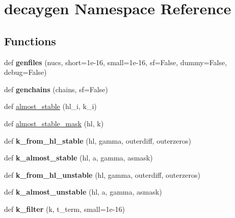 \hypertarget{namespacedecaygen}{}\section{decaygen Namespace Reference}
\label{namespacedecaygen}
\subsection*{Functions}
\begin{DoxyCompactItemize}
\item 
\mbox{\label{namespacedecaygen_adbcd52f4570e4712d8b5775dfab66488}} 
def {\bfseries genfiles} (nucs, short=1e-\/16, small=1e-\/16, sf=\+False, dummy=\+False, debug=\+False)
\item 
\mbox{\label{namespacedecaygen_add2576d70a319652092870680a494f61}} 
def {\bfseries genchains} (chains, sf=False)
\item 
def \hyperlink{namespacedecaygen_a8267524e00bea03ef7218742ef99b713}{almost\+\_\+stable} (hl\+\_\+i, k\+\_\+i)
\item 
def \hyperlink{namespacedecaygen_a03f99e352f15d9f51dcc70013a1fe2d9}{almost\+\_\+stable\+\_\+mask} (hl, k)
\item 
\mbox{\label{namespacedecaygen_a20bec31b237980720b3aeea51e17d704}} 
def {\bfseries k\+\_\+from\+\_\+hl\+\_\+stable} (hl, gamma, outerdiff, outerzeros)
\item 
\mbox{\label{namespacedecaygen_a80c6e300b14db55d752f256c5c7d839e}} 
def {\bfseries k\+\_\+almost\+\_\+stable} (hl, a, gamma, asmask)
\item 
\mbox{\label{namespacedecaygen_a24e4370241d690db193bc05272bfe4cc}} 
def {\bfseries k\+\_\+from\+\_\+hl\+\_\+unstable} (hl, gamma, outerdiff, outerzeros)
\item 
\mbox{\label{namespacedecaygen_ad78888ec26425081df44a9bdb4388b31}} 
def {\bfseries k\+\_\+almost\+\_\+unstable} (hl, a, gamma, asmask)
\item 
\mbox{\label{namespacedecaygen_ab11b63a385f0121b352ba2d15e627ee0}} 
def {\bfseries k\+\_\+filter} (k, t\+\_\+term, small=1e-\/16)

\end{DoxyCompactItemize}
